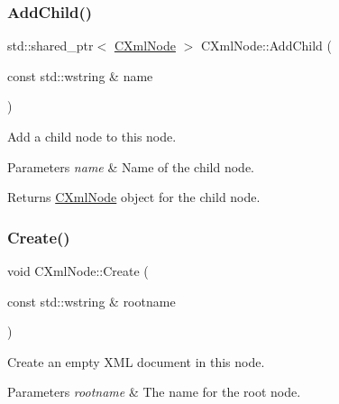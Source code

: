 \subsubsection{\texorpdfstring{AddChild()}{AddChild()}}
{\footnotesize\ttfamily std\+::shared\+\_\+ptr$<$ \mbox{\hyperlink{classxmlnode_1_1_c_xml_node}{C\+Xml\+Node}} $>$ C\+Xml\+Node\+::\+Add\+Child (\begin{DoxyParamCaption}\item[{const std\+::wstring \&}]{name }\end{DoxyParamCaption})}



Add a child node to this node. 


\begin{DoxyParams}{Parameters}
{\em name} & Name of the child node. \\
\hline
\end{DoxyParams}
\begin{DoxyReturn}{Returns}
\mbox{\hyperlink{classxmlnode_1_1_c_xml_node}{C\+Xml\+Node}} object for the child node. 
\end{DoxyReturn}
\mbox{\label{classxmlnode_1_1_c_xml_node_a7f4a7dee5a7de490507b9d0ed78dbab7}} 
\subsubsection{\texorpdfstring{Create()}{Create()}}
{\footnotesize\ttfamily void C\+Xml\+Node\+::\+Create (\begin{DoxyParamCaption}\item[{const std\+::wstring \&}]{rootname }\end{DoxyParamCaption})}



Create an empty X\+ML document in this node. 


\begin{DoxyParams}{Parameters}
{\em rootname} & The name for the root node. \\
\hline
\end{DoxyParams}
\mbox{\label{classxmlnode_1_1_c_xml_node_ae50a4482c4ea73492001f91788945bb1}} 
